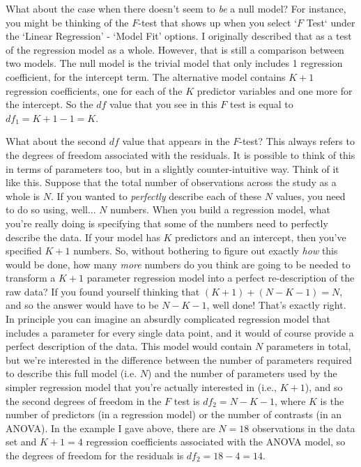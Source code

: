 What about the case when there doesn't seem to {\it be} a null model? For instance, you might be thinking of the $F$-test that shows up when you select `$F$ Test` under the `Linear Regression' - `Model Fit' options. I originally described that as a test of the regression model as a whole. However, that is still a comparison between two models. The null model is the trivial model that only includes 1 regression coefficient, for the intercept term. The alternative model contains $K+1$ regression coefficients, one for each of the $K$ predictor variables and one more for the intercept. So the $df$ value that you see in this $F$ test is equal to $df_1 = K+1-1 = K$.

What about the second $df$ value that appears in the $F$-test? This always refers to the degrees of freedom associated with the residuals. It is possible to think of this in terms of parameters too, but in a slightly counter-intuitive way. Think of it like this. Suppose that the total number of observations across the study as a whole is $N$. If you wanted to {\it perfectly} describe each of these $N$ values, you need to do so using, well... $N$ numbers. When you build a regression model, what you're really doing is specifying that some of the numbers need to perfectly describe the data. If your model has $K$ predictors and an intercept, then you've specified $K+1$ numbers. So, without bothering to figure out exactly {\it how} this would be done, how many {\it more} numbers do you think are going to be needed to transform a $K+1$ parameter regression model into a perfect re-description of the raw data? If you found yourself thinking that $(K+1) + (N-K-1) = N$, and so the answer would have to be $N-K-1$, well done! That's exactly right. In principle you can imagine an absurdly complicated regression model that includes a parameter for every single data point, and it would of course provide a perfect description of the data. This model would contain $N$ parameters in total, but we're interested in the difference between the number of parameters required to describe this full model (i.e. $N$) and the number of parameters used by the simpler regression model that you're actually interested in (i.e., $K+1$), and so the second degrees of freedom in the $F$ test is $df_2 = N-K-1$, where $K$ is the number of predictors (in a regression model) or the number of contrasts (in an ANOVA). In the example I gave above, there are $N=18$ observations in the data set and $K+1 = 4$ regression coefficients associated with the ANOVA model, so the degrees of freedom for the residuals is $df_2 = 18-4 = 14$. 


